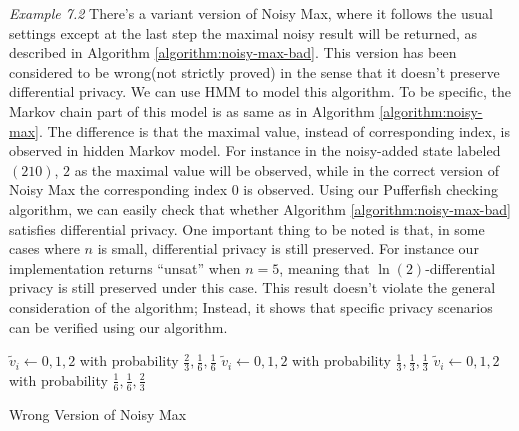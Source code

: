 \textit{Example 7.2} There's a variant version of Noisy Max, where it follows the usual settings 
except at the last step the maximal
noisy result will be returned, as described in Algorithm \ref{algorithm:noisy-max-bad}.
This version has been considered to be wrong(not strictly proved) in the sense that it doesn't preserve differential privacy.
We can use HMM to model this algorithm.
To be specific, the Markov chain part of this model is as same as in Algorithm \ref{algorithm:noisy-max}.
The difference is that the maximal value, instead of corresponding index, is observed in hidden Markov
model. For instance in the noisy-added state labeled $(210)$,
$2$ as the maximal value will be observed, while in the correct version of Noisy Max the corresponding index $0$ is observed.
Using our Pufferfish checking algorithm, we can easily check that whether
Algorithm \ref{algorithm:noisy-max-bad} satisfies differential privacy.
One important thing to be noted is that, in some cases where $n$ is small,
differential privacy is still preserved.
For instance our implementation returns ``unsat'' when $n=5$, meaning that
$\ln(2)$-differential privacy is still preserved under this case.
This result doesn't violate the general consideration of the algorithm;
Instead, it shows that specific privacy scenarios can be verified using our algorithm.

\begin{algorithm}
  \begin{algorithmic}[1]
                {$\tilde{v}_i \leftarrow 0, 1, 2$ with probability
                 $\frac{2}{3}, \frac{1}{6}, \frac{1}{6}$}
                {$\tilde{v}_i \leftarrow 0, 1, 2$ with probability
                 $\frac{1}{3}, \frac{1}{3}, \frac{1}{3}$}
                {$\tilde{v}_i \leftarrow 0, 1, 2$ with probability
                 $\frac{1}{6}, \frac{1}{6}, \frac{2}{3}$}
        \EndMatch
      \EndFor
    \EndFunction
  \end{algorithmic}
  \caption{Wrong Version of Noisy Max}
  \label{algorithm:noisy-max-bad}
\end{algorithm}
